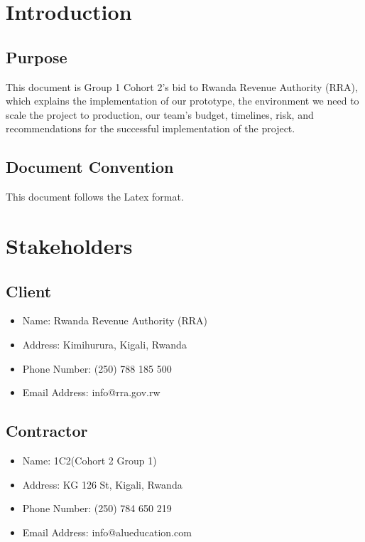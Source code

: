 \documentclass[12pt,a4paper]{article}
\begin{document}
\doublespacing
\tableofcontents
\singleplacing

\vspace{15cm}


\section{Introduction}

\subsection{Purpose}

This document is Group 1 Cohort 2's bid to Rwanda Revenue Authority (RRA), which explains the implementation of our prototype, the environment we need to scale the project to production, our team’s budget, timelines, risk, and recommendations for the successful implementation of the project.

\subsection{Document Convention}

This document follows the Latex format. 

\section{Stakeholders}

\subsection{Client}

\begin{itemize}
\item Name: 
Rwanda Revenue Authority (RRA)
\item Address: 
Kimihurura, Kigali, Rwanda
\item Phone Number: 
(250) 788 185 500
\item Email Address: 
info@rra.gov.rw
\end{itemize}

\subsection{Contractor}

\begin{itemize}
\item Name: 
1C2(Cohort 2 Group 1)
\item Address: 
KG 126 St, Kigali, Rwanda
\item Phone Number: 
(250) 784 650 219
\item Email Address: 
info@alueducation.com
\end{itemize}
\end{document}

